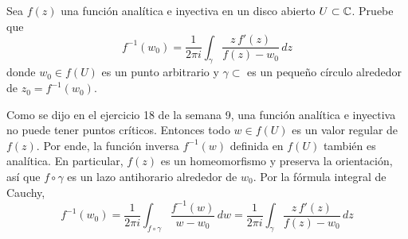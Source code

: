 \begin{exercise}
Sea $f(z)$ una función analítica e inyectiva en un disco abierto $U \subset \mathbb C$. Pruebe que
$$f^{-1}(w_0) = \frac 1 {2\pi i} \int_\gamma \frac {z \, f'(z)} {f(z) - w_0} \, dz$$
donde $w_0 \in f(U)$ es un punto arbitrario y $\gamma \subset $ es un pequeño círculo alrededor de $z_0 = f^{-1}(w_0)$.
\end{exercise}

\begin{solution}
Como se dijo en el ejercicio 18 de la semana 9, una función analítica e inyectiva no puede tener puntos críticos. Entonces todo $w \in f(U)$ es un valor regular de $f(z)$. Por ende, la función inversa $f^{-1}(w)$ definida en $f(U)$ también es analítica. En particular, $f(z)$ es un homeomorfismo y preserva la orientación, así que $f \circ \gamma$ es un lazo antihorario alrededor de $w_0$. Por la fórmula integral de Cauchy,
$$
f^{-1}(w_0)
    = \frac 1 {2\pi i} \int_{f \circ \gamma} \frac {f^{-1}(w)} {w - w_0} \, dw
    = \frac 1 {2\pi i} \int_\gamma \frac {z \, f'(z)} {f(z) - w_0} \, dz
$$
\end{solution}
